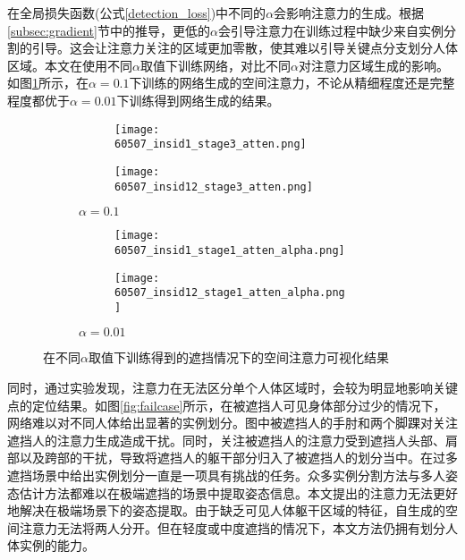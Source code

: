 在全局损失函数(公式\eqref{detection_loss})中不同的$\alpha$会影响注意力的生成。根据\ref{subsec:gradient}节中的推导，更低的$\alpha$会引导注意力在训练过程中缺少来自实例分割的引导。这会让注意力关注的区域更加零散，使其难以引导关键点分支划分人体区域。本文在使用不同$\alpha$取值下训练网络，对比不同$\alpha$对注意力区域生成的影响。如图\ref{fig:attenalpha}所示，在$\alpha=0.1$下训练的网络生成的空间注意力，不论从精细程度还是完整程度都优于$\alpha=0.01$下训练得到网络生成的结果。

\begin{figure}[H]
	\centering
	\begin{subfigure}{0.3\textwidth}
		\centering
		\begin{subfigure}{\linewidth}
			\texttt{[image: 60507\_insid1\_stage3\_atten.png]}
		\end{subfigure}
		\vskip2pt
		\begin{subfigure}{\linewidth}
			\texttt{[image: 60507\_insid12\_stage3\_atten.png]}
		\end{subfigure}
		\caption{$\alpha=0.1$}
	\end{subfigure}
	\begin{subfigure}{0.3\textwidth}
		\centering
		\begin{subfigure}{\linewidth}
			\texttt{[image: 60507\_insid1\_stage1\_atten\_alpha.png]}
		\end{subfigure}
		\vskip2pt
		\begin{subfigure}{\linewidth}
			\texttt{[image: 60507\_insid12\_stage1\_atten\_alpha.png]}
		\end{subfigure}
		\caption{$\alpha=0.01$}
	\end{subfigure}
	\begin{minipage}{0.05\linewidth}
		
		\vskip2cm
	\end{minipage}
	\caption{在不同$\alpha$取值下训练得到的遮挡情况下的空间注意力可视化结果}
	\label{fig:attenalpha}
\end{figure}

同时，通过实验发现，注意力在无法区分单个人体区域时，会较为明显地影响关键点的定位结果。如图\ref{fig:failcase}所示，在被遮挡人可见身体部分过少的情况下，网络难以对不同人体给出显著的实例划分。图中被遮挡人的手肘和两个脚踝对关注遮挡人的注意力生成造成干扰。同时，关注被遮挡人的注意力受到遮挡人头部、肩部以及跨部的干扰，导致将遮挡人的躯干部分归入了被遮挡人的划分当中。在过多遮挡场景中给出实例划分一直是一项具有挑战的任务。众多实例分割方法与多人姿态估计方法都难以在极端遮挡的场景中提取姿态信息。本文提出的注意力无法更好地解决在极端场景下的姿态提取。由于缺乏可见人体躯干区域的特征，自生成的空间注意力无法将两人分开。但在轻度或中度遮挡的情况下，本文方法仍拥有划分人体实例的能力。

